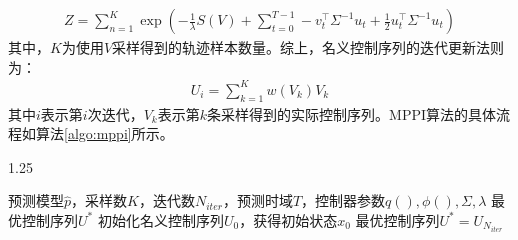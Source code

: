 \begin{equation}
\begin{aligned}
    Z = \sum_{n=1}^{K} \exp \left(-\frac{1}{\lambda}S(V) + \sum_{t=0}^{T-1} -v_t^\top \Sigma^{-1} u_t + \frac{1}{2} u_t^\top \Sigma^{-1} u_t \right)
\end{aligned}
\end{equation}
其中，$K$为使用$V$采样得到的轨迹样本数量。综上，名义控制序列的迭代更新法则为：
\begin{equation}
\begin{aligned}
    U_{i} = \sum_{k=1}^{K} w(V_k)V_k
\end{aligned}
\end{equation}
其中$i$表示第$i$次迭代，$V_k$表示第$k$条采样得到的实际控制序列。MPPI算法的具体流程如算法\ref{algo:mppi}所示。
\begin{algorithm}[ht]
    \begin{spacing}{1.25}
	\caption{MPPI控制算法}
    \renewcommand{\arraystretch}{1.25}
	\label{algo:mppi}
	\begin{algorithmic}[1]
        \REQUIRE 预测模型$\hat{p}$，采样数$K$，迭代数$N_{iter}$，预测时域$T$，控制器参数$q(), \phi(), \Sigma, \lambda$
        \ENSURE 最优控制序列$U^*$
        \STATE 初始化名义控制序列$U_0$，获得初始状态$x_0$
		\ENDFOR
        \RETURN 最优控制序列$U^* = U_{N_{iter}}$
	\end{algorithmic}
    \end{spacing}
\end{algorithm}

